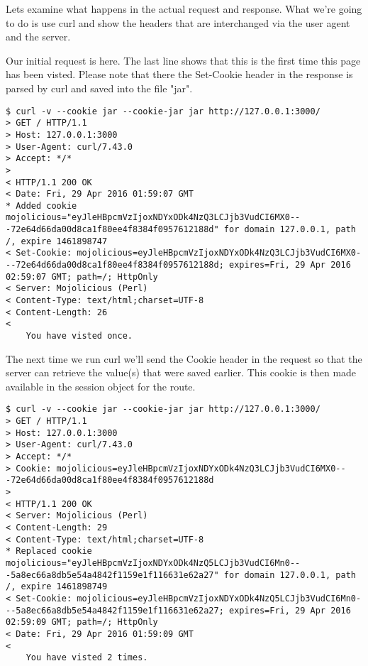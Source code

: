 \documentclass[14pt]{extreport}
\begin{document}


Lets examine what happens in the actual request and response.  What we're going
to do is use curl and show the headers that are interchanged via the user agent
and the server.

\clearpage

Our initial request is here.  The last line shows that this is the first time this
page has been visted.  Please note that there the Set-Cookie header in the response
is parsed by curl and saved into the file "jar".

\begin{lstlisting}[style=BashOutputStyle]
$ curl -v --cookie jar --cookie-jar jar http://127.0.0.1:3000/
> GET / HTTP/1.1
> Host: 127.0.0.1:3000
> User-Agent: curl/7.43.0
> Accept: */*
> 
< HTTP/1.1 200 OK
< Date: Fri, 29 Apr 2016 01:59:07 GMT
* Added cookie mojolicious="eyJleHBpcmVzIjoxNDYxODk4NzQ3LCJjb3VudCI6MX0---72e64d66da00d8ca1f80ee4f8384f0957612188d" for domain 127.0.0.1, path /, expire 1461898747
< Set-Cookie: mojolicious=eyJleHBpcmVzIjoxNDYxODk4NzQ3LCJjb3VudCI6MX0---72e64d66da00d8ca1f80ee4f8384f0957612188d; expires=Fri, 29 Apr 2016 02:59:07 GMT; path=/; HttpOnly
< Server: Mojolicious (Perl)
< Content-Type: text/html;charset=UTF-8
< Content-Length: 26
< 
    You have visted once.
\end{lstlisting}

The next time we run curl we'll send the Cookie header in the request so that the server
can retrieve the value(s) that were saved earlier.  This cookie is then made available in the
session object for the route.

\begin{lstlisting}[style=BashOutputStyle]
$ curl -v --cookie jar --cookie-jar jar http://127.0.0.1:3000/
> GET / HTTP/1.1
> Host: 127.0.0.1:3000
> User-Agent: curl/7.43.0
> Accept: */*
> Cookie: mojolicious=eyJleHBpcmVzIjoxNDYxODk4NzQ3LCJjb3VudCI6MX0---72e64d66da00d8ca1f80ee4f8384f0957612188d
> 
< HTTP/1.1 200 OK
< Server: Mojolicious (Perl)
< Content-Length: 29
< Content-Type: text/html;charset=UTF-8
* Replaced cookie mojolicious="eyJleHBpcmVzIjoxNDYxODk4NzQ5LCJjb3VudCI6Mn0---5a8ec66a8db5e54a4842f1159e1f116631e62a27" for domain 127.0.0.1, path /, expire 1461898749
< Set-Cookie: mojolicious=eyJleHBpcmVzIjoxNDYxODk4NzQ5LCJjb3VudCI6Mn0---5a8ec66a8db5e54a4842f1159e1f116631e62a27; expires=Fri, 29 Apr 2016 02:59:09 GMT; path=/; HttpOnly
< Date: Fri, 29 Apr 2016 01:59:09 GMT
< 
    You have visted 2 times.
\end{lstlisting}
\end{document}
